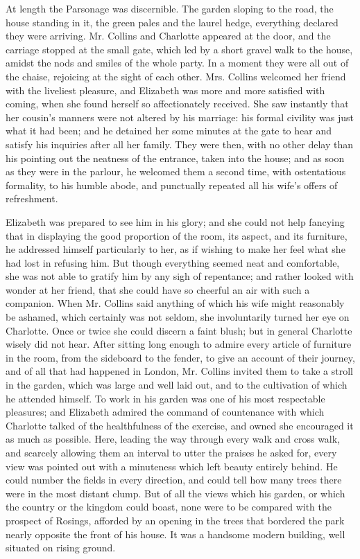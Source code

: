 \documentclass[10pt]{book}
\begin{document}
   At length the Parsonage was discernible. The garden
   sloping to the
road, the house standing in it, the green pales and the laurel hedge,
everything declared they were arriving. Mr. Collins and Charlotte
appeared at the door, and the carriage stopped at the small gate, which
led by a short gravel walk to the house, amidst the nods and smiles of
the whole party. In a moment they were all out of the chaise, rejoicing
at the sight of each other. Mrs. Collins welcomed her friend with the
liveliest pleasure, and Elizabeth was more and more satisfied with
coming, when she found herself so affectionately received. She saw
instantly that her cousin’s manners were not altered by his marriage:
his formal civility was just what it had been; and he detained her some
minutes at the gate to hear and satisfy his inquiries after all her
family. They were then, with no other delay than his pointing out the
neatness of the entrance, taken into the house; and as soon as they were
in the parlour, he welcomed them a second time, with ostentatious
formality, to his humble abode, and punctually repeated all his wife’s
offers of refreshment.
  

   Elizabeth was prepared to see him in his glory; and she could not help
fancying that in displaying the good proportion of the room, its aspect,
and its furniture, he addressed himself particularly to her, as if
wishing to make her feel what she had lost in refusing him. But though
everything seemed neat and comfortable, she was not able to gratify him
by any sigh of repentance; and rather looked with wonder at her friend,
that she could have so cheerful an air with such a companion. When Mr.
Collins said anything of which his wife might reasonably be ashamed,
which certainly was not seldom, she involuntarily turned her eye on
Charlotte. Once or twice she could discern a faint blush; but in general
Charlotte
   wisely did not hear. After sitting long enough to admire
every article of furniture in the room, from the sideboard to the
fender, to give an account of their journey, and of all that had
happened in London, Mr. Collins invited them to take a stroll in the
garden, which was large and well laid out, and to the cultivation of
which he attended himself. To work in his garden was one of his most
respectable pleasures; and Elizabeth admired the command of countenance
with which Charlotte talked of the healthfulness of the exercise, and
owned she encouraged it as much as possible. Here, leading the way
through every walk and cross walk, and scarcely allowing them an
interval to utter the praises he asked for, every view was pointed out
with a minuteness which left beauty entirely behind. He could number the
fields in every direction, and could tell how many trees there were in
the most distant clump. But of all the views which his garden, or which
the country or the kingdom could boast, none were to be compared with
the prospect of Rosings, afforded by an opening in the trees that
bordered the park nearly opposite the front of his house. It was a
handsome modern building, well situated on rising ground.
  
\end{document}
